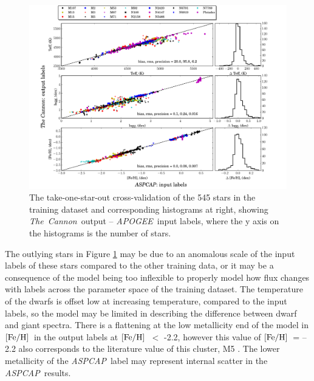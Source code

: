 \documentclass[12pt, preprint]{aastex}
\newcommand{\feh}{\mbox{$\rm [Fe/H]$}}
\newcommand{\tc}{\textsl{The~Cannon}}
\newcommand{\apogee}{\textsl{APOGEE}}
\newcommand{\aspcap}{\textsl{ASPCAP}}
\begin{document}
\begin{figure}[h!]
\centering
    \includegraphics[scale=0.45]{./plots/takeout_hist.pdf}
\caption{The take-one-star-out cross-validation of the 545 stars in the training dataset and corresponding histograms at right, showing \tc\ output -- \apogee\ input labels, where the y axis on the histograms is the number of stars.}
\label{fig:takeonestarout}
\end{figure}


The outlying stars in Figure \ref{fig:takeonestarout} may be due to an anomalous scale of the input labels of these stars compared to the other training data, or it may be a consequence of the model being too inflexible to properly model how flux changes with labels across the parameter space of the training dataset. The temperature of the dwarfs is offset low at increasing temperature, compared to the input labels, so the model may be limited in describing the difference between dwarf and giant spectra. There is a flattening at the low metallicity end of the model in \feh\ in the output labels at \feh\ $<$ -2.2, however this value of \feh\ = --2.2 also corresponds to the literature value of this cluster, M5 \citep{Meszaros2013}. The lower metallicity of the \aspcap\ label may represent internal scatter in the \aspcap\ results.
\end{document}
